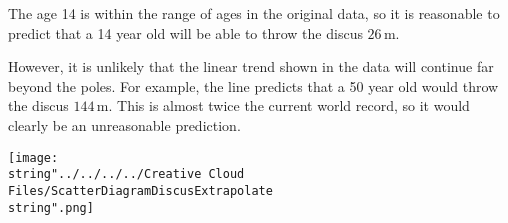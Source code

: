 \documentclass[11pt,a4paper]{book}
\begin{document}
\begin{minipage}{.45\textwidth}

The age 14 is within the range of ages in the original data, so it
is reasonable to predict that a 14 year old will be able to throw
the discus $26\,\text{m}$.

\medskip

However, it is unlikely that the linear trend shown in the data will
continue far beyond the poles. For example, the line predicts that
a 50 year old would throw the discus $144\,\text{m}$. This is almost
twice the current world record, so it would clearly be an unreasonable
prediction.

\end{minipage}
\begin{minipage}{.54\textwidth}
\begin{center}
\texttt{[image: \\string"../../../../Creative Cloud Files/ScatterDiagramDiscusExtrapolate\\string".png]}
\par\end{center}

\end{minipage}

\newpage{}
\end{document}
